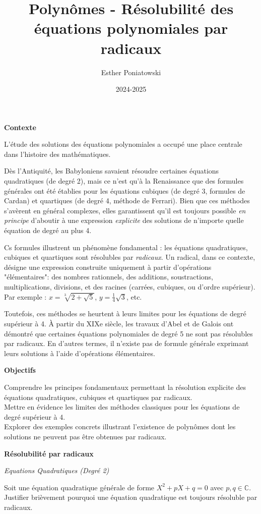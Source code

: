 \documentclass[10pt,a4paper]{article}
\title{Polynômes - Résolubilité des équations polynomiales par radicaux}
\author{Esther Poniatowski}
\date{2024-2025}
\begin{document}
\textbf{Contexte}

L'étude des solutions des équations polynomiales a occupé une place centrale dans l'histoire des
mathématiques.

Dès l'Antiquité, les Babyloniens savaient résoudre certaines équations quadratiques (de degré 2),
mais ce n'est qu'à la Renaissance que des formules générales ont été établies pour les équations
cubiques (de degré 3, formules de Cardan) et quartiques (de degré 4, méthode de Ferrari). Bien que
ces méthodes s'avèrent en général complexes, elles garantissent qu'il est toujours possible
\textit{en principe} d'aboutir à une expression \textit{explicite} des solutions de n'importe quelle
équation de degré au plus 4.

Cs formules illustrent un phénomène fondamental : les équations quadratiques, cubiques et quartiques
sont résolubles par \textit{radicaux}. Un radical, dans ce contexte, désigne une expression
construite uniquement à partir d'opérations "élémentaires": des nombres rationnels, des additions,
soustractions, multiplications, divisions, et des racines (carrées, cubiques, ou d'ordre supérieur).
Par exemple : \( x = \sqrt[3]{2 + \sqrt{5}} \), \( y = \frac{1}{4}\sqrt{3} \), etc.

Toutefois, ces méthodes se heurtent à leurs limites pour les équations de degré supérieur à 4. À
partir du XIXe siècle, les travaux d'Abel et de Galois ont démontré que certaines équations
polynomiales de degré 5 ne sont pas résolubles par radicaux. En d'autres termes, il n'existe pas de
formule générale exprimant leurs solutions à l'aide d'opérations élémentaires.

\bigskip
\textbf{Objectifs}

Comprendre les principes fondamentaux permettant la résolution explicite des équations quadratiques,
cubiques et quartiques par radicaux. \\
Mettre en évidence les limites des méthodes classiques pour les équations de degré supérieur à 4. \\
Explorer des exemples concrets illustrant l'existence de polynômes dont les solutions ne peuvent pas
être obtenues par radicaux.

\bigskip
\textbf{Résolubilité par radicaux}

\bigskip
\textit{Equations Quadratiques (Degré 2)}

\q Soit une équation quadratique générale de forme \( X^2 + pX + q = 0 \) avec \( p, q \in \mathbb{C} \).
Justifier brièvement pourquoi une équation quadratique est toujours résoluble par radicaux.
\end{document}
